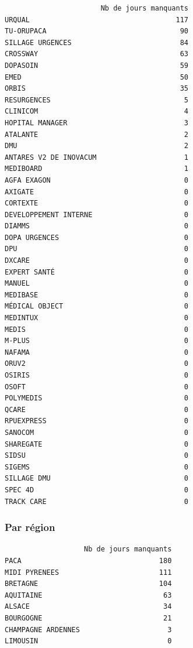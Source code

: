 \documentclass[]{article}
\begin{document}
\begin{verbatim}
                       Nb de jours manquants
URQUAL                                   117
TU-ORUPACA                                90
SILLAGE URGENCES                          84
CROSSWAY                                  63
DOPASOIN                                  59
EMED                                      50
ORBIS                                     35
RESURGENCES                                5
CLINICOM                                   4
HOPITAL MANAGER                            3
ATALANTE                                   2
DMU                                        2
ANTARES V2 DE INOVACUM                     1
MEDIBOARD                                  1
AGFA EXAGON                                0
AXIGATE                                    0
CORTEXTE                                   0
DEVELOPPEMENT INTERNE                      0
DIAMMS                                     0
DOPA URGENCES                              0
DPU                                        0
DXCARE                                     0
EXPERT SANTÉ                               0
MANUEL                                     0
MEDIBASE                                   0
MÉDICAL OBJECT                             0
MEDINTUX                                   0
MEDIS                                      0
M-PLUS                                     0
NAFAMA                                     0
ORUV2                                      0
OSIRIS                                     0
OSOFT                                      0
POLYMEDIS                                  0
QCARE                                      0
RPUEXPRESS                                 0
SANOCOM                                    0
SHAREGATE                                  0
SIDSU                                      0
SIGEMS                                     0
SILLAGE DMU                                0
SPEC 4D                                    0
TRACK CARE                                 0
\end{verbatim}

\subsubsection{Par région}\label{par-region}

\begin{verbatim}
                   Nb de jours manquants
PACA                                 180
MIDI PYRENEES                        111
BRETAGNE                             104
AQUITAINE                             63
ALSACE                                34
BOURGOGNE                             21
CHAMPAGNE ARDENNES                     3
LIMOUSIN                               0
\end{verbatim}
\end{document}
